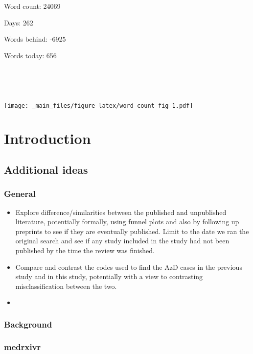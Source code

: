 \documentclass[a4paper, twoside]{templates/ociamthesis}
\begin{document}
\adjustmtc

Word count: 24069

Days: 262

Words behind: -6925

Words today: 656

~

~

\texttt{[image: \_main\_files/figure-latex/word-count-fig-1.pdf]}



\hypertarget{intro-heading}{%
\chapter{Introduction}\label{intro-heading}}

\minitoc 

\hypertarget{additional-ideas}{%
\section{Additional ideas}\label{additional-ideas}}

\hypertarget{general}{%
\subsection{General}\label{general}}

\begin{itemize}
\item
  Explore difference/similarities between the published and unpublished literature, potentially formally, using funnel plots and also by following up preprints to see if they are eventually published. Limit to the date we ran the original search and see if any study included in the study had not been published by the time the review was finished.
\item
  Compare and contrast the codes used to find the AzD cases in the previous study and in this study, potentially with a view to contrasting misclassification between the two.
\item
\end{itemize}

\hypertarget{background}{%
\subsection{Background}\label{background}}

\hypertarget{medrxivr}{%
\subsection{medrxivr}\label{medrxivr}}
\end{document}
